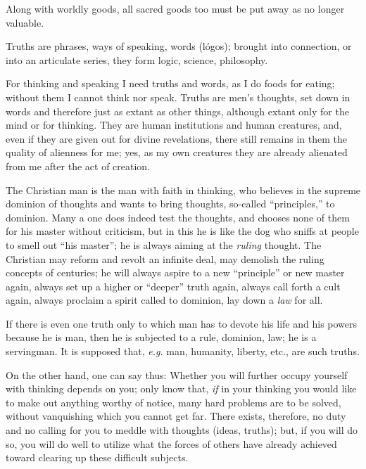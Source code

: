 Along with worldly goods, all sacred goods too must be put away as no longer 
valuable.

Truths are phrases, ways of speaking, words (l\'ogos); brought into 
connection, or into an articulate series, they form logic, science, 
philosophy.

For thinking and speaking I need truths and words, as I do foods for eating; 
without them I cannot think nor speak. Truths are men's thoughts, set down in 
words and therefore just as extant as other things, although extant only for 
the mind or for thinking. They are human institutions and human creatures, 
and, even if they are given out for divine revelations, there still remains in 
them the quality of alienness for me; yes, as my own creatures they are 
already alienated from me after the act of creation.

The Christian man is the man with faith in thinking, who believes in the 
supreme dominion of thoughts and wants to bring thoughts, so-called 
``principles,'' to dominion. Many a one does indeed test the thoughts, and 
chooses none of them for his master without criticism, but in this he is like 
the dog who sniffs at people to smell out ``his master''; he is always 
aiming at the \textit{ruling} thought. The Christian may reform and revolt an 
infinite deal, may demolish the ruling concepts of centuries; he will always 
aspire to a new ``principle'' or new master again, always set up a higher or 
``deeper'' truth again, always call forth a cult again, always proclaim a 
spirit called to dominion, lay down a \textit{law} for all.

If there is even one truth only to which man has to devote his life and his 
powers because he is man, then he is subjected to a rule, dominion, law; he is 
a servingman. It is supposed that, \textit{e.g.} man, humanity, liberty, 
etc., are such truths.

On the other hand, one can say thus: Whether you will further occupy yourself 
with thinking depends on you; only know that, \textit{if} in your thinking you 
would like to make out anything worthy of notice, many hard problems are to be 
solved, without vanquishing which you cannot get far. There exists, therefore, 
no duty and no calling for you to meddle with thoughts (ideas, truths); but, 
if you will do so, you will do well to utilize what the forces of others have 
already achieved toward clearing up these difficult subjects.

